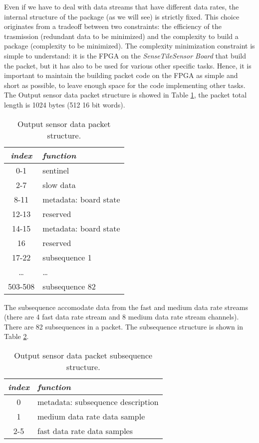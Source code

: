 \documentclass{article}
\newcommand{\ST}{\emph{SenseTile}\xspace}
\newcommand{\STSB}{\ST \emph{Sensor Board}\xspace}
\begin{document}
Even if we have to deal with data streams that have different data rates, the 
internal structure of the package (as we will see) is strictly fixed. 
This choice originates from a tradeoff between two constraints: the efficiency 
of the trasmission (redundant data to be minimized) and the complexity to build 
a package (complexity to be minimized).
The complexity minimization constraint is simple to understand: it is the FPGA 
on the \STSB that build the packet, but it has also to be used for various 
other specific tasks. 
Hence, it is important to maintain the building packet code on the FPGA as 
simple and short as possible, to leave enough space for the code implementing 
other tasks.
The Output sensor data packet structure is showed in Table 
\ref{tab:data_packet_structure}, the packet total length is 1024 bytes (512 16 
bit words).

\begin{table}[htbp]
\caption{Output sensor data packet structure.}
\label{tab:data_packet_structure}
\begin{center}
\begin{tabular}{|c|l|}\hline
\textbf{\textit{index}} & \textbf{\textit{function}}\\\hline
0-1 & sentinel\\\hline
2-7 & slow data\\\hline
8-11 & metadata: board state\\\hline
12-13 & reserved\\\hline
14-15 & metadata: board state\\\hline
16 & reserved\\\hline
17-22 & subsequence 1\\\hline
\ldots & \ldots\\\hline
503-508 & subsequence 82\\\hline
\end{tabular}
\end{center}
\end{table}

The subsequence accomodate data from the fast and medium data rate streams 
(there are 4 fast data rate stream and 8 medium data rate stream channels). 
There are 82 subsequences in a packet.
The subsequence structure is shown in Table \ref{tab:subsequence_structure}.

\begin{table}[htbp]
\caption{Output sensor data packet subsequence structure.}
\label{tab:subsequence_structure}
\begin{center}
\begin{tabular}{|c|l|}\hline
\textbf{\textit{index}} & \textbf{\textit{function}}\\\hline
0 & metadata: subsequence description\\\hline
1 & medium data rate data sample\\\hline
2-5 & fast data rate data samples\\\hline
\end{tabular}
\end{center}
\end{table}
\end{document}
